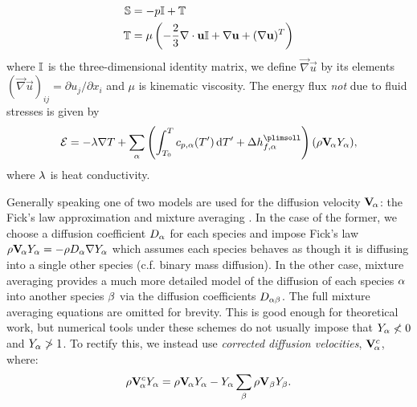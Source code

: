 \begin{subequations}
\begin{align}
\mathbb{S} &= -p\mathbb{I} + \mathbb{T} \\
\mathbb{T} &= \mu \left( - \frac{2}{3}\mathbf{\nabla}\cdot\mathbf{u} \mathbb{I} + \mathbf{\nabla}\mathbf{u} + (\mathbf{\nabla}\mathbf{u})^T \right)
\end{align}
\end{subequations}
where $\mathbb{I}$ is the three-dimensional identity matrix, we define $\vec{\nabla}\vec{u}$ by its elements $(\vec{\nabla}\vec{u})_{ij} = \partial u_j / \partial x_i$ and $\mu$ is kinematic viscosity. The energy flux \emph{not} due to fluid stresses is given by
\begin{align}
\vec{\cl{E}} = -\l \vec{\nabla} T + \sum_\a \left( \int_{T_0}^T c_{p, \a}(T') \dd{T'} + \D h_{f, \a}^\plimsoll \right) (\r \vec{V}_{\!\a} Y_\a),
\end{align}
where $\lambda$ is heat conductivity.

Generally speaking one of two models are used for the diffusion velocity $\mathbf{V}_{\!\alpha}$: the Fick's law approximation \cite{fick1855UeberDiffusion} and mixture averaging \cite{hirschfelder1964MolecularTheoryGases, comsol2023MulticomponentDiffusionMixtureAveraged}. In the case of the former, we choose a diffusion coefficient $D_\alpha$ for each species and impose Fick's law $\rho \mathbf{V}_{\!\alpha} Y_\alpha = - \rho D_\alpha \mathbf{\nabla} Y_\alpha$ which assumes each species behaves as though it is diffusing into a single other species (c.f. binary mass diffusion). In the other case, mixture averaging provides a much more detailed model of the diffusion of each species $\alpha$ into another species $\beta$ via the diffusion coefficients $D_{\alpha\beta}$. The full mixture averaging equations are omitted for brevity. This is good enough for theoretical work, but numerical tools under these schemes do not usually impose that $Y_\alpha \nless 0$ and $Y_\alpha \ngtr 1$. To rectify this, we instead use \emph{corrected diffusion velocities}, $\mathbf{V}_{\!\alpha}^c$, where:
\begin{equation}
\rho \mathbf{V}_{\!\alpha}^c Y_\alpha = \rho \mathbf{V}_{\!\alpha} Y_\alpha - Y_\alpha \sum_{\beta} \rho \mathbf{V}_\beta Y_\beta.
\end{equation}


